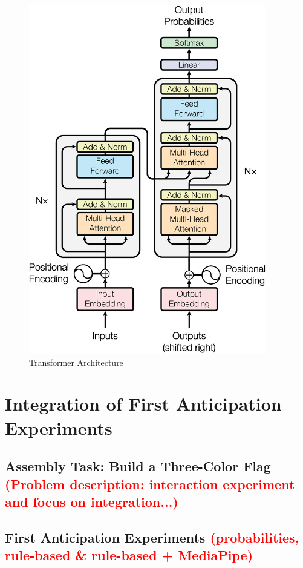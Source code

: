 \begin{figure}[h]
\centerline{\includegraphics[height=6in]{figs/transformer.jpg}}
\caption[Transformer Architecture]{Transformer Architecture \cite{Vaswani2017}}
\label{fig:transformer_arch}
\end{figure}

\section{Integration of First Anticipation Experiments}

\subsection{Assembly Task: Build a Three-Color Flag \textcolor{red}{(Problem description: interaction experiment and focus on integration...)}}

\subsection{First Anticipation Experiments \textcolor{red}{(probabilities, rule-based \& rule-based + MediaPipe)}}

